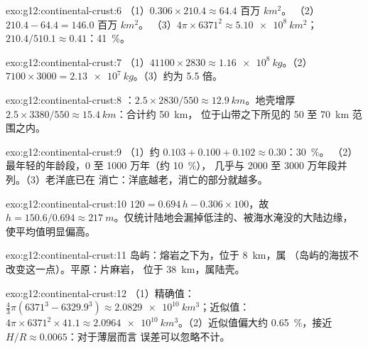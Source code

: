 \begin{solution}{exo:g12:continental-crust:6}
（1）$0.306 \times 210.4 \approx \num{64.4}\text{ 百万 }\unit{km^2}$。
（2）$210.4 - 64.4 = \num{146.0}\text{ 百万 }\unit{km^2}$。
（3）$4\pi \times 6371^2 \approx \qty{5.10e8}{km^2}$；$210.4/510.1 \approx
0.41$：\qty{41}{\percent}。
\end{solution}

\begin{solution}{exo:g12:continental-crust:7}
（1）$41100 \times 2830 \approx \qty{1.16e8}{kg}$。（2）$7100 \times 3000 =
\qty{2.13e7}{kg}$。（3）约为 5.5 倍。
\end{solution}

\begin{solution}{exo:g12:continental-crust:8}
：$2.5 \times 2830/550 \approx \qty{12.9}{km}$。地壳增厚
$2.5 \times 3380/550 \approx \qty{15.4}{km}$：合计约 \qty{50}{km}，
位于山带之下所见的 50 至 \qty{70}{km} 范围之内。
\end{solution}

\begin{solution}{exo:g12:continental-crust:9}
（1）约 $0.103 + 0.100 + 0.102 \approx 0.30$：\qty{30}{\percent}。
（2）最年轻的年龄段，0 至 1000 万年（约 \qty{10}{\percent}），
几乎与 2000 至 3000 万年段并列。（3）老洋底已在
消亡：洋底越老，消亡的部分就越多。
\end{solution}

\begin{solution}{exo:g12:continental-crust:10}
$120 = 0.694\,h - 0.306 \times 100$，故 $h = 150.6/0.694 \approx
\qty{217}{m}$。仅统计陆地会漏掉低洼的、被海水淹没的大陆边缘，
使平均值明显偏高。
\end{solution}

\begin{solution}{exo:g12:continental-crust:11}
岛屿：熔岩之下为，位于 \qty{8}{km}，属
（岛屿的海拔不改变这一点）。平原：片麻岩，
位于 \qty{38}{km}，属陆壳。
\end{solution}

\begin{solution}{exo:g12:continental-crust:12}
（1）精确值：$\tfrac{4}{3}\pi(6371^3 - 6329.9^3) \approx
\qty{2.0829e10}{km^3}$；近似值：$4\pi \times 6371^2 \times 41.1
\approx \qty{2.0964e10}{km^3}$。（2）近似值偏大约
\qty{0.65}{\percent}，接近 $H/R \approx 0.0065$：对于薄层而言
误差可以忽略不计。
\end{solution}

